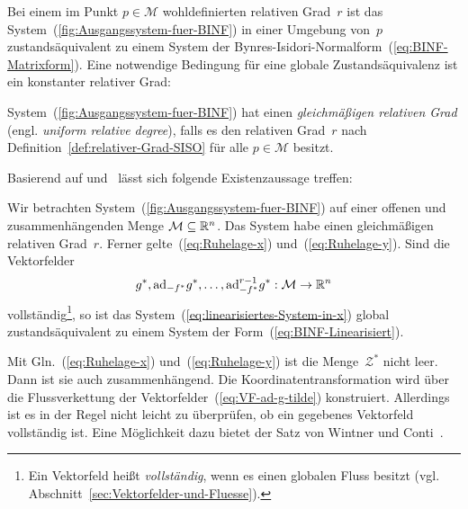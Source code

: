Bei einem im Punkt $p\in\mathcal{M}$ wohldefinierten relativen Grad~$r$
ist das System~(\ref{fig:Ausgangssystem-fuer-BINF}) in einer Umgebung
von~$p$ zustandsäquivalent zu einem System der Bynres-Isidori-Normalform~(\ref{eq:BINF-Matrixform}).
Eine notwendige Bedingung für eine globale Zustandsäquivalenz ist
ein konstanter relativer Grad:
\begin{definition}
\label{def:gleichmaessiger-relativer-grad}System~(\ref{fig:Ausgangssystem-fuer-BINF})
hat einen \emph{gleichmäßigen relativen Grad}
(engl. \emph{uniform relative degree}), falls es den relativen Grad~$r$
nach Definition~\ref{def:relativer-Grad-SISO} für alle $p\in\mathcal{M}$
besitzt.
\end{definition}
Basierend auf \cite{byrnes91nf} und~\cite[Kapitel~9]{isidori3}
lässt sich folgende Existenzaussage treffen:
\begin{theorem}
\label{them:globale-BINF}Wir betrachten System~(\ref{fig:Ausgangssystem-fuer-BINF})
auf einer offenen und zusammenhängenden Menge $\mathcal{M}\subseteq{\mathbb{R}}^{n}$.
Das System habe einen gleichmäßigen relativen Grad~$r$. Ferner gelte~(\ref{eq:Ruhelage-x})
und~(\ref{eq:Ruhelage-y}). Sind die Vektorfelder 
\begin{equation}
g^{*},{\operatorname{ad}}_{-f^{*}}g^{*},\ldots,{\operatorname{ad}}_{-f^{*}}^{r-1}g^{*}:\mathcal{M}\to{\mathbb{R}}^{n}\label{eq:VF-ad-g-tilde}
\end{equation}
vollständig\footnote{Ein Vektorfeld heißt \textit{vollständig}, wenn es einen globalen
Fluss besitzt (vgl. Abschnitt~\ref{sec:Vektorfelder-und-Fluesse}).}, so ist das System~(\ref{eq:linearisiertes-System-in-x}) global
zustandsäquivalent zu einem System der Form~(\ref{eq:BINF-Linearisiert}).
\end{theorem}
Mit Gln.~(\ref{eq:Ruhelage-x}) und~(\ref{eq:Ruhelage-y}) ist die
Menge~$\mathcal{Z}^{*}$ nicht leer. Dann ist sie auch zusammenhängend.
Die Koordinatentransformation wird über die Flussverkettung der Vektorfelder~(\ref{eq:VF-ad-g-tilde})
konstruiert. Allerdings ist es in der Regel nicht leicht zu überprüfen,
ob ein gegebenes Vektorfeld vollständig ist. Eine Möglichkeit dazu
bietet der Satz von Wintner und Conti~\cite{reitmann96}.

\medskip{}

